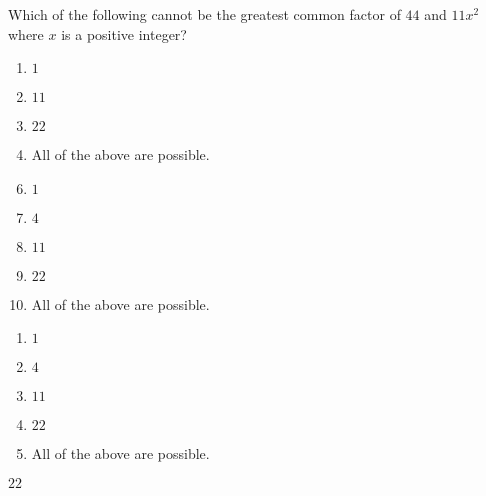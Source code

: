 

  Which of the following cannot be the greatest common factor of $44$ and $11x^{2}$ where $x$ is a positive integer? 


\ifsat
	\begin{enumerate}[label=\Alph*)]
		\item  $1$  
		\item  $11$  
		\item  $22$%
		\item  All of the above are possible.
	\end{enumerate}
\else
\fi

\ifacteven
	\begin{enumerate}[label=\textbf{\Alph*.},itemsep=\fill,align=left]
		\setcounter{enumii}{5}
		\item  $1$  
		\item  $4$  
		\item  $11$  
		\addtocounter{enumii}{1}
		\item  $22$%
		\item  All of the above are possible.
	\end{enumerate}
\else
\fi

\ifactodd
	\begin{enumerate}[label=\textbf{\Alph*.},itemsep=\fill,align=left]
		\item  $1$  
		\item  $4$  
		\item  $11$  
		\item  $22$%
		\item  All of the above are possible.
	\end{enumerate}
\else
\fi

\ifgridin
  $22$%
		
\else
\fi

